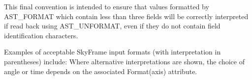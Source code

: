 \documentclass[twoside,11pt]{article}
\newcommand{\htmlref}[2]{#1}
\begin{document}
{{{      }
      This final convention is intended to ensure that values formatted
      by AST\_FORMAT which contain less than three fields will be
      correctly interpreted if read back using AST\_UNFORMAT, even if
      they do not contain field identification characters.

      Examples of acceptable SkyFrame input formats (with
      interpretation in parentheses) include:
      Where alternative interpretations are shown, the choice of angle or
      time depends on the associated \htmlref{Format(axis)}{Formataxis} attribute.
   }
}
\end{document}
